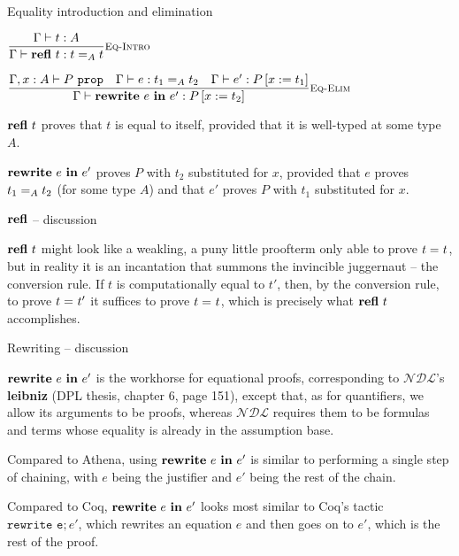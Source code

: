 \documentclass{beamer}
\newcommand{\NDL}{\mathcal{NDL}}
\begin{document}
\begin{frame}{Equality introduction and elimination}

\begin{center}
  $\infrule[Eq-Intro]{\typing{t}{A}}{\proves{\refl[t]}{\Eq[A]{t}{t}}}$

  \vspace{2em}

  $\infrule[Eq-Elim]{\prop[\extend{\Gamma}{x}{A}]{P} \quad \proves{e}{\Eq[A]{t_1}{t_2}} \quad \proves{e'}{\subst{P}{x}{t_1}}}{\proves{\rewrite{e}{e'}}{\subst{P}{x}{t_2}}}$
\end{center}

\vspace{2em}

$\refl[t]$ proves that $t$ is equal to itself, provided that it is well-typed at some type $A$.

\vspace{2em}

$\rewrite{e}{e'}$ proves $P$ with $t_2$ substituted for $x$, provided that $e$ proves $\Eq[A]{t_1}{t_2}$ (for some type $A$) and that $e'$ proves $P$ with $t_1$ substituted for $x$.

\end{frame}

\begin{frame}{$\refl$ -- discussion}

$\refl[t]$ might look like a weakling, a puny little proofterm only able to prove $\Eq{t}{t}$, but in reality it is an incantation that summons the invincible juggernaut -- the conversion rule. If $t$ is computationally equal to $t'$, then, by the conversion rule, to prove $\Eq{t}{t'}$ it suffices to prove $\Eq{t}{t}$, which is precisely what $\refl[t]$ accomplishes.

\end{frame}

\begin{frame}{Rewriting -- discussion}

$\rewrite{e}{e'}$ is the workhorse for equational proofs, corresponding to $\NDL$'s \textbf{leibniz} (DPL thesis, chapter 6, page 151), except that, as for quantifiers, we allow its arguments to be proofs, whereas $\NDL$ requires them to be formulas and terms whose equality is already in the assumption base.

\vspace{1em}

Compared to Athena, using $\rewrite{e}{e'}$ is similar to performing a single step of chaining, with $e$ being the justifier and $e'$ being the rest of the chain.

\vspace{1em}

Compared to Coq, $\rewrite{e}{e'}$ looks most similar to Coq's tactic $\texttt{rewrite e}; e'$, which rewrites an equation $e$ and then goes on to $e'$, which is the rest of the proof.

\end{frame}
\end{document}
